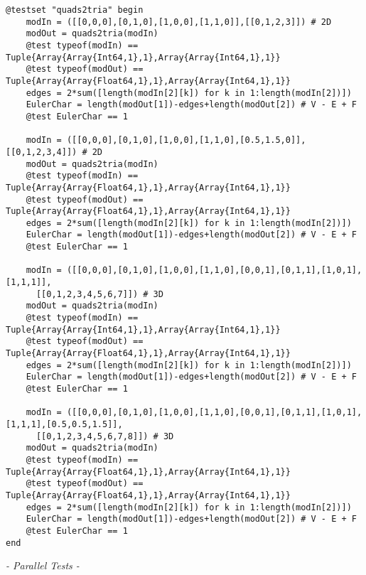 \documentclass[a4paper,12pt,titlepage]{article}					%
\begin{document}
\begin{Verbatim}
@testset "quads2tria" begin
	modIn = ([[0,0,0],[0,1,0],[1,0,0],[1,1,0]],[[0,1,2,3]]) # 2D
	modOut = quads2tria(modIn)
	@test typeof(modIn) == Tuple{Array{Array{Int64,1},1},Array{Array{Int64,1},1}}
	@test typeof(modOut) == Tuple{Array{Array{Float64,1},1},Array{Array{Int64,1},1}}
	edges = 2*sum([length(modIn[2][k]) for k in 1:length(modIn[2])])
	EulerChar = length(modOut[1])-edges+length(modOut[2]) # V - E + F
	@test EulerChar == 1
	
	modIn = ([[0,0,0],[0,1,0],[1,0,0],[1,1,0],[0.5,1.5,0]],[[0,1,2,3,4]]) # 2D
	modOut = quads2tria(modIn)
	@test typeof(modIn) == Tuple{Array{Array{Float64,1},1},Array{Array{Int64,1},1}}
	@test typeof(modOut) == Tuple{Array{Array{Float64,1},1},Array{Array{Int64,1},1}}
	edges = 2*sum([length(modIn[2][k]) for k in 1:length(modIn[2])])
	EulerChar = length(modOut[1])-edges+length(modOut[2]) # V - E + F
	@test EulerChar == 1
	
	modIn = ([[0,0,0],[0,1,0],[1,0,0],[1,1,0],[0,0,1],[0,1,1],[1,0,1],[1,1,1]],
	  [[0,1,2,3,4,5,6,7]]) # 3D
	modOut = quads2tria(modIn)
	@test typeof(modIn) == Tuple{Array{Array{Int64,1},1},Array{Array{Int64,1},1}}
	@test typeof(modOut) == Tuple{Array{Array{Float64,1},1},Array{Array{Int64,1},1}}
	edges = 2*sum([length(modIn[2][k]) for k in 1:length(modIn[2])])
	EulerChar = length(modOut[1])-edges+length(modOut[2]) # V - E + F
	@test EulerChar == 1
	
	modIn = ([[0,0,0],[0,1,0],[1,0,0],[1,1,0],[0,0,1],[0,1,1],[1,0,1],[1,1,1],[0.5,0.5,1.5]],
	  [[0,1,2,3,4,5,6,7,8]]) # 3D
	modOut = quads2tria(modIn)
	@test typeof(modIn) == Tuple{Array{Array{Float64,1},1},Array{Array{Int64,1},1}}
	@test typeof(modOut) == Tuple{Array{Array{Float64,1},1},Array{Array{Int64,1},1}}
	edges = 2*sum([length(modIn[2][k]) for k in 1:length(modIn[2])])
	EulerChar = length(modOut[1])-edges+length(modOut[2]) # V - E + F
	@test EulerChar == 1
end
\end{Verbatim}

\emph{- Parallel Tests -}
\end{document}
